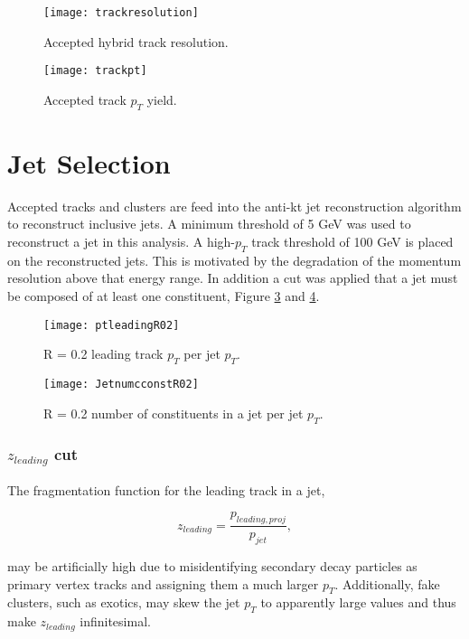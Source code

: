 \begin{figure}[h]
\texttt{[image: trackresolution]}
\centering
\caption{Accepted hybrid track resolution.}
\label{fig:trackresolution}
\end{figure}

\begin{figure}[h]
\texttt{[image: trackpt]}
\centering
\caption{Accepted track $p_{T}$ yield.}
\label{fig:hybtrackpt}
\end{figure}


\section{Jet Selection}

Accepted tracks and clusters are feed into the anti-kt jet reconstruction algorithm to reconstruct inclusive jets.  A minimum threshold of 5 GeV was used to reconstruct a jet in this analysis.  A high-$p_{T}$ track threshold of 100 GeV is placed on the reconstructed jets.  This is motivated by the degradation of the momentum resolution above that energy range.  In addition a cut was applied that a jet must be composed of at least one constituent, Figure \ref{fig:JetPt} and \ref{fig:JetConst}.

\begin{figure}[h]
\texttt{[image: ptleadingR02]}
\centering
\caption{R = 0.2 leading track $p_{T}$ per jet $p_{T}$.}
\label{fig:JetPt}
\end{figure}

\begin{figure}[h]
\texttt{[image: JetnumcconstR02]}
\centering
\caption{R = 0.2 number of constituents in a jet per jet $p_{T}$.}
\label{fig:JetConst}
\end{figure}



\noindent
\subsubsection{$z_{leading}$ cut}

The fragmentation function for the leading track in a jet,

\begin{equation}
z_{leading} = \frac{ p_{leading, proj} }{ p_{jet} },
\label{eq:zleading}
\end{equation}

\noindent
may be artificially high due to misidentifying secondary decay particles as primary vertex tracks and assigning them a much larger $p_{T}$.  Additionally, fake clusters, such as exotics, may skew the jet $p_{T}$ to apparently large values and thus make $z_{leading}$ infinitesimal.  

